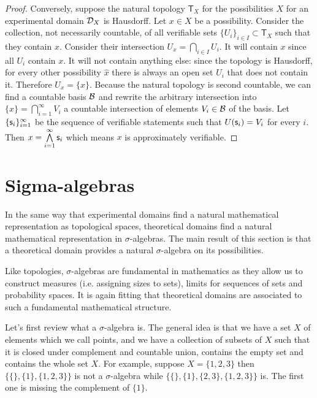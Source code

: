 \documentclass[11pt,letterpaper,fleqn]{memoir} %
\begin{document}
\begin{mathSection}
\begin{proof}
	Conversely, suppose the natural topology $\mathsf{T}_X$ for the possibilities $X$ for an experimental domain $\mathcal{D}_X$ is Hausdorff. Let $x \in X$ be a possibility. Consider the collection, not necessarily countable, of all verifiable sets $\{U_i\}_{i \in I} \subset \mathsf{T}_X$ such that they contain $x$. Consider their intersection $U_x = \bigcap\limits_{i \in I} U_i$. It will contain $x$ since all $U_i$ contain $x$. It will not contain anything else: since the topology is Hausdorff, for every other possibility $\hat{x}$ there is always an open set $U_i$ that does not contain it. Therefore $U_x = \{x\}$. Because the natural topology is second countable, we can find a countable basis $\mathcal{B}$ and rewrite the arbitrary intersection into $\{x\} = \bigcap\limits_{i=1}^\infty V_i$ a countable intersection of elements $V_i \in \mathcal{B}$ of the basis. Let $\{\mathsf{s}_i\}_{i=1}^\infty$ be the sequence of verifiable statements such that $U(\mathsf{s}_i) = V_i$ for every $i$. Then $x=\bigwedge\limits_{i=1}^\infty \mathsf{s}_i$ which means $x$ is approximately verifiable.

\end{proof}
\end{mathSection}

\section{Sigma-algebras}

In the same way that experimental domains find a natural mathematical representation as topological spaces, theoretical domains find a natural mathematical representation in $\sigma$-algebras. The main result of this section is that a theoretical domain provides a natural $\sigma$-algebra on its possibilities.

Like topologies, $\sigma$-algebras are fundamental in mathematics as they allow us to construct measures (i.e. assigning sizes to sets), limits for sequences of sets and probability spaces. It is again fitting that theoretical domains are associated to such a fundamental mathematical structure.

Let's first review what a $\sigma$-algebra is. The general idea is that we have a set $X$ of elements which we call points, and we have a collection of subsets of $X$ such that it is closed under complement and countable union, contains the empty set and contains the whole set $X$. For example, suppose $X = \{1,2,3\}$ then  $\{\{\},\{1\},\{1,2,3\}\}$ is not a $\sigma$-algebra while $\{\{\},\{1\}, \{2,3\},\{1,2,3\}\}$ is. The first one is missing the complement of $\{1\}$.
\end{document}
